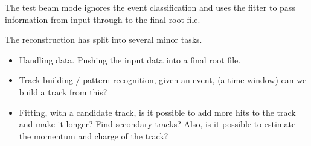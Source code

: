 The test beam mode ignores the event classification and uses the fitter to pass information from input through to the final root file.

The reconstruction has split into several minor tasks.
\begin{itemize}
\item Handling data. Pushing the input data into a final root file.
\item Track building / pattern recognition, given an event, (a time window) can we build a track from this?
\item Fitting, with a candidate track, is it possible to add more hits to the track and make it longer? Find secondary tracks? Also, is it possible to estimate the momentum and charge of the track?
\end{itemize}


